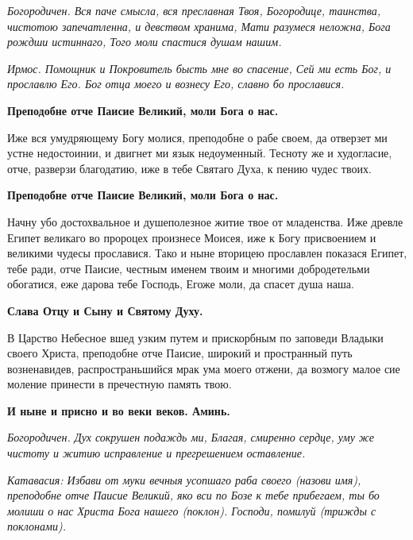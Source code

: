 \itshape Богородичен.\normalfont{} Вся паче смысла, вся преславная Твоя, Богородице, таинства, чистотою запечатленна, и девством хранима, Мати разумеся неложна, Бога рождши истиннаго, Того моли спастися душам нашим.








\itshape Ирмос.\normalfont{} Помощник и Покровитель бысть мне во спасение, Сей ми есть Бог, и прославлю Его. Бог отца моего и вознесу Его, славно бо прославися.




\bfseries Преподобне отче Паисие Великий, моли Бога о нас.\normalfont{}\nopagebreak




Иже вся умудряющему Богу молися, преподобне о рабе своем, да отверзет ми устне недостоинии, и двигнет ми язык недоуменный. Тесноту же и худогласие, отче, разверзи благодатию, иже в тебе Святаго Духа, к пению чудес твоих.




\bfseries Преподобне отче Паисие Великий, моли Бога о нас.\normalfont{} 




Начну убо достохвальное и душеполезное житие твое от младенства. Иже древле Египет великаго во пророцех произнесе Моисея, иже к Богу присвоением и великими чудесы прославися. Тако и ныне вторицею прославлен показася Египет, тебе ради, отче Паисие, честным именем твоим и многими добродетельми обогатися, еже дарова тебе Господь, Егоже моли, да спасет душа наша. 




\bfseries Слава Отцу и Сыну и Святому Духу.\normalfont{} 




В Царство Небесное вшед узким путем и прискорбным по заповеди Владыки своего Христа, преподобне отче Паисие, широкий и пространный путь
возненавидев, распространьшийся мрак ума моего отжени, да возмогу малое сие моление принести в пречестную память твою. 




\bfseries И ныне и присно и во веки веков. Аминь.\normalfont{} 




\itshape Богородичен.\normalfont{} Дух сокрушен подаждь ми, Благая, смиренно сердце, уму же чистоту и житию исправление и прегрешением оставление. 




\itshape Катавасия:\normalfont{} Избави от муки вечныя усопшаго раба своего \itshape (назови имя)\normalfont{}, преподобне отче Паисие Великий, яко вси по Бозе к тебе прибегаем, ты бо молиши о нас Христа Бога нашего (\itshape поклон\normalfont{}). Господи, помилуй (\itshape трижды с поклонами\normalfont{}).




